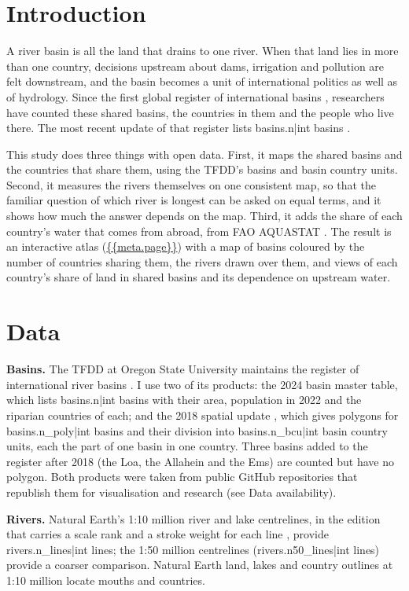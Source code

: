 \documentclass[11pt,a4paper]{article}
\begin{document}
\section{Introduction}
A river basin is all the land that drains to one river. When that land lies in more than one country, decisions upstream about dams, irrigation and pollution are felt downstream, and the basin becomes a unit of international politics as well as of hydrology. Since the first global register of international basins \citep{wolf1999}, researchers have counted these shared basins, the countries in them and the people who live there. The most recent update of that register lists {{basins.n|int}} basins \citep{tfdd,mccracken2019}.

This study does three things with open data. First, it maps the shared basins and the countries that share them, using the TFDD's basins and basin country units. Second, it measures the rivers themselves on one consistent map, so that the familiar question of which river is longest can be asked on equal terms, and it shows how much the answer depends on the map. Third, it adds the share of each country's water that comes from abroad, from FAO AQUASTAT \citep{aquastat}. The result is an interactive atlas (\url{{{meta.page}}}) with a map of basins coloured by the number of countries sharing them, the rivers drawn over them, and views of each country's share of land in shared basins and its dependence on upstream water.

\section{Data}
\textbf{Basins.} The TFDD at Oregon State University maintains the register of international river basins \citep{tfdd}. I use two of its products: the 2024 basin master table, which lists {{basins.n|int}} basins with their area, population in 2022 and the riparian countries of each; and the 2018 spatial update \citep{mccracken2019}, which gives polygons for {{basins.n_poly|int}} basins and their division into {{basins.n_bcu|int}} basin country units, each the part of one basin in one country. Three basins added to the register after 2018 (the Loa, the Allahein and the Ems) are counted but have no polygon. Both products were taken from public GitHub repositories that republish them for visualisation and research (see Data availability).

\textbf{Rivers.} Natural Earth's 1:10 million river and lake centrelines, in the edition that carries a scale rank and a stroke weight for each line \citep{naturalearth}, provide {{rivers.n_lines|int}} lines; the 1:50 million centrelines ({{rivers.n50_lines|int}} lines) provide a coarser comparison. Natural Earth land, lakes and country outlines at 1:10 million locate mouths and countries.
\end{document}
